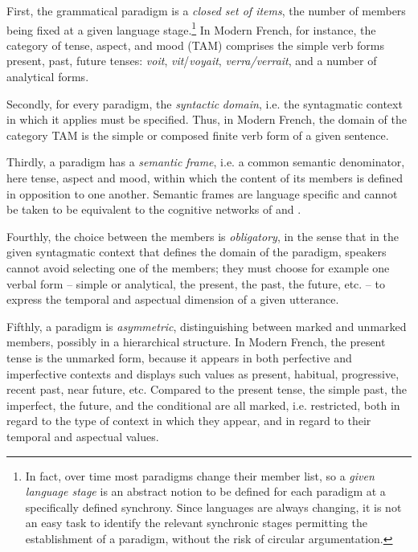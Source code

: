\documentclass[output=paper]{langsci/langscibook}
\begin{document}
First, the grammatical paradigm is a \textit{closed set of items}, the number of members being fixed at a given language stage.\footnote{In fact, over time most paradigms change their member list, so a \textit{given language stage} is an abstract notion to be defined for each paradigm at a specifically defined synchrony. Since languages are always changing, it is not an easy task to identify the relevant synchronic stages permitting the establishment of a paradigm, without the risk of circular argumentation.} In Modern French, for instance, the category of tense, aspect, and mood (TAM) comprises the simple verb forms present, past, future tenses: \textit{voit}, \textit{vit}/\textit{voyait}, \textit{verra/verrait}, and a number of analytical forms.

Secondly, for every paradigm, the \textit{syntactic} \textit{domain}, i.e. the syntagmatic context in which it applies must be specified. Thus, in Modern French, the domain of the category TAM is the simple or composed finite verb form of a given sentence.

Thirdly, a paradigm has a \textit{semantic} \textit{frame}, i.e. a common semantic denominator, here tense, aspect and mood, within which the content of its members is defined in opposition to one another. Semantic frames are language specific and cannot be taken to be equivalent to the cognitive networks of \citet{Croft2001} and \citet{CroftCruse2004}.

Fourthly, the choice between the members is \textit{obligatory}, in the sense that in the given syntagmatic context that defines the domain of the paradigm, speakers cannot avoid selecting one of the members; they must choose for example one verbal form -- simple or analytical, the present, the past, the future, etc. -- to express the temporal and aspectual dimension of a given utterance.

\begin{sloppypar}
Fifthly, a paradigm is \textit{asymmetric}, distinguishing between marked and unmarked members, possibly in a hierarchical structure. In Modern French, the present tense is the unmarked form, because it appears in both perfective and imperfective contexts and displays such values as present, habitual, progressive, recent past, near future, etc. Compared to the present tense, the simple past, the imperfect, the future, and the conditional are all marked, i.e. restricted, both in regard to the type of context in which they appear, and in regard to their temporal and aspectual values.
\end{sloppypar}
\end{document}
